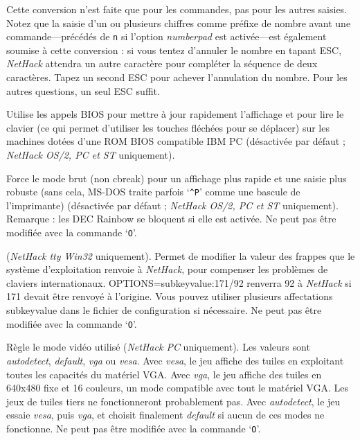 \documentclass[titlepage]{article}
\begin{document}
\begin{description}[font=\mdseries\itshape]
Cette conversion n'est faite que pour les commandes, pas pour les autres saisies.
Notez que la saisie d'un ou plusieurs chiffres comme préfixe de nombre avant une
commande---précédés de \texttt{n} si l'option \textit{number\textunderscore pad}
est activée---est
également soumise à cette conversion : si vous tentez
d'annuler le nombre en tapant ESC, \textit{NetHack} attendra un autre
caractère pour compléter la séquence de deux caractères.
Tapez un second ESC pour achever l'annulation du nombre.
Pour les autres questions, un seul ESC suffit.
\item[BIOS]
Utilise les appels BIOS pour mettre à jour rapidement l'affichage et pour lire le clavier
(ce qui permet d'utiliser les touches fléchées pour se déplacer) sur les machines dotées
d'une ROM BIOS compatible IBM PC (désactivée par défaut ; \textit{NetHack OS/2, PC {\rm et} ST} uniquement).
\item[rawio]
Force le mode brut (non cbreak) pour un affichage plus rapide et une saisie
plus robuste (sans cela, MS-DOS traite parfois `\texttt{\textasciicircum P}' comme une bascule
de l'imprimante) (désactivée par défaut ; \textit{NetHack OS/2, PC {\rm et} ST} uniquement).
Remarque : les DEC Rainbow se bloquent si elle est activée.
Ne peut pas être modifiée avec la commande `\texttt{O}'.
\item[subkeyvalue]
(\textit{NetHack tty Win32} uniquement).
Permet de modifier la valeur des frappes que le système d'exploitation
renvoie à \textit{NetHack}, pour compenser les problèmes de claviers
internationaux.
OPTIONS=subkeyvalue:171/92
renverra 92 à \textit{NetHack} si 171 devait être renvoyé à l'origine.
Vous pouvez utiliser plusieurs affectations subkeyvalue dans le fichier de
configuration si nécessaire.
Ne peut pas être modifiée avec la commande `\texttt{O}'.
\item[video]
Règle le mode vidéo utilisé (\textit{NetHack PC} uniquement).
Les valeurs sont \textit{autodetect}, \textit{default}, \textit{vga} ou \textit{vesa}.
Avec \textit{vesa}, le jeu affiche des tuiles en exploitant toutes les
capacités du matériel VGA.
Avec \textit{vga}, le jeu affiche des tuiles en 640x480 fixe
et 16 couleurs, un mode compatible avec tout le matériel VGA. Les jeux
de tuiles tiers ne fonctionneront probablement pas.
Avec \textit{autodetect}, le jeu essaie \textit{vesa}, puis \textit{vga}, et
choisit finalement \textit{default} si aucun de ces modes ne fonctionne.
Ne peut pas être modifiée avec la commande `\texttt{O}'.
\item[video\textunderscore height]

\end{description}
\end{document}
